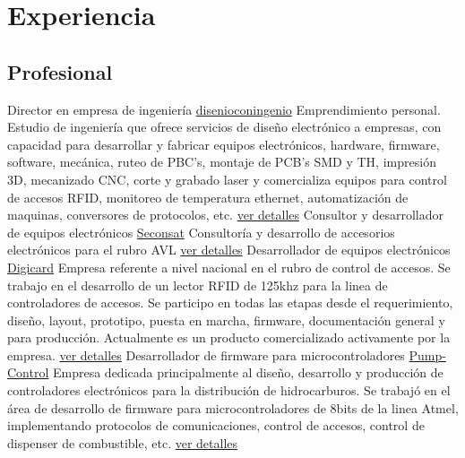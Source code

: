 \documentclass[11pt,a4paper,sans]{moderncv}  %
\begin{document}
\section{Experiencia}
\subsection{Profesional}
    { Director en empresa de ingeniería}                 { \href { www.disenioconingenio.com.ar} { disenioconingenio}} { } { } { Emprendimiento personal. Estudio de ingeniería que ofrece servicios de diseño electrónico a empresas, con capacidad para desarrollar y fabricar equipos electrónicos, hardware, firmware, software, mecánica, ruteo de PBC's, montaje de PCB's SMD y TH, impresión 3D, mecanizado CNC, corte y grabado laser y comercializa equipos para control de accesos RFID, monitoreo de temperatura ethernet, automatización de maquinas, conversores de protocolos, etc. \href { http://disenioconingenio.com.ar/producto.php?products_id=398} { ver detalles}}
        { Consultor y desarrollador de equipos electrónicos} { \href { www.seconsat.com}             { Seconsat}}          { } { } { Consultoría y desarrollo de accesorios electrónicos para el rubro AVL \href                                                                                                                                                                                                                                                                                                                                                                                            { http://disenioconingenio.com.ar/producto.php?products_id=392} { ver detalles}}
        { Desarrollador de equipos electrónicos}             { \href { www.digicard.com.ar}          { Digicard}}          { } { } { Empresa referente a nivel nacional en el rubro de control de accesos. Se trabajo en el desarrollo de un lector RFID de 125khz para la linea de controladores de accesos. Se participo en todas las etapas desde el requerimiento, diseño, layout, prototipo, puesta en marcha, firmware, documentación general y para producción. Actualmente es un producto comercializado activamente por la empresa. \href                                                          { http://disenioconingenio.com.ar/producto.php?products_id=393} { ver detalles}}
        { Desarrollador de firmware para microcontroladores} { \href { www.pump-control.com.ar}      { Pump-Control}}      { } { } { Empresa dedicada principalmente al diseño, desarrollo y producción de controladores electrónicos para la distribución de hidrocarburos. Se trabajó en el área de desarrollo de firmware para microcontroladores de 8bits de la linea Atmel, implementando protocolos de comunicaciones, control de accesos, control de dispenser de combustible, etc. \href                                                                                                            { http://disenioconingenio.com.ar/producto.php?products_id=391} { ver detalles}}
\end{document}
